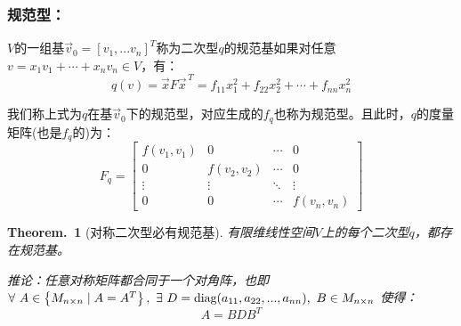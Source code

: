 \documentclass[zihao=5,UTF8]{report}
\theoremstyle{mystyle} %
\newtheorem{theorem}{Theorem.\,}
\begin{document}
\subsubsection{规范型：}
$V$的一组基$\vec{v}_0 = \left[v_1,...v_n\right]^T$称为二次型$q$的规范基如果对任意$v = x_1v_1 +\cdots +x_nv_n \in V$，有：
\begin{equation*}
    q(v) = \vec{x}F\vec{x}^{\,T} = f_{11}x_1^2 + f_{22}x_2^2 + \cdots +f_{nn}x_n^2
\end{equation*}\par
我们称上式为$q$在基$\vec{v}_0$下的规范型，对应生成的$f_q$也称为规范型。且此时，$q$的度量矩阵(也是$f_q$的)为：
\begin{equation*}
    F_q = 
    \begin{bmatrix}  
        f(v_1,v_1) & 0 & \cdots & 0 \\  
        0 & f(v_2,v_2)& \cdots & 0 \\  
        \vdots & \vdots & \ddots & \vdots \\  
        0 & 0 & \cdots & f(v_n,v_n)  
    \end{bmatrix} 
\end{equation*}

\begin{theorem}[对称二次型必有规范基]
   有限维线性空间$V$上的每个二次型$q$，都存在规范基。\par
   推论：任意对称矩阵都合同于一个对角阵，也即$ \forall\ A \in \left\{ M_{n\times n}\mid A = A^T \right\},\ \exists\  D =\\ \text{diag}(a_{11},a_{22},...,a_{nn}),\ B\in M_{n\times n}\ $使得：
   \begin{equation*}
    A = BDB^T
   \end{equation*}
\end{theorem}
\end{document}
